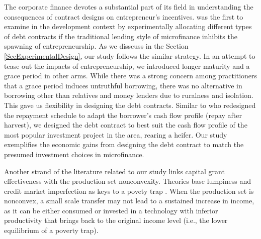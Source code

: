 	The corporate finance devotes a substantial part of its field in understanding the consequences of contract designs on entrepreneur's incentives. \citet{Field2013} was the first to examine in the development context by experimentally allocating different types of debt contracts if the traditional lending style of microfinance inhibits the spawning of entrepreneurship.  %
	As we disscuss in the Section \ref{SecExperimentalDesign}, our study follows the similar strategy. In an attempt to tease out the impacts of entrepreneurship, we introduced longer maturity and a grace period in other arms. While there was a strong concern among practitioners that a grace period induces untruthful borrowing, there was no alternative in borrowing other than relatives and money lenders due to ruralness and isolation. This gave us flexibility in designing the debt contracts. Similar to \citet{Beaman2015} who redesigned the repayment schedule to adapt the borrower's cash flow profile (repay after harvest), we designed the debt contract to best suit the cash flow profile of the most popular investment project in the area, rearing a heifer. %
	Our study exemplifies the economic gains from designing the debt contract to match the presumed investment choices in microfinance.

	Another strand of the literature related to our study links capital grant effectiveness with the production set nonconvexity. Theories base lumpiness and credit market imperfection as keys to a povety trap \citep[e.g., ][]{GalorZeira1993}. When the production set is nonconvex, a small scale transfer may not lead to a sustained increase in income, as it can be either consumed or invested in a technology with inferior productivity that brings back to the original income level (i.e., the lower equilibrium of a poverty trap). 
	
